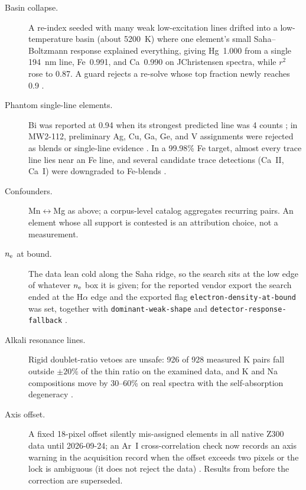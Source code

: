 \begin{description}
\item[Basin collapse.] A re-index seeded with many weak low-excitation lines drifted into a low-temperature basin (about \SI{5200}{\kelvin}) where one element's small Saha--Boltzmann response explained everything, giving Hg~1.000 from a single \SI{194}{\nano\metre} line, Fe~0.991, and Ca~0.990 on JChristensen spectra, while $r^2$ rose to 0.87. A guard rejects a re-solve whose top fraction newly reaches 0.9 %
.
\item[Phantom single-line elements.] Bi was reported at 0.94 when its strongest predicted line was 4 counts %
; in MW2-112, preliminary Ag, Cu, Ga, Ge, and V assignments were rejected as blends or single-line evidence %
. In a 99.98\% Fe target, almost every trace line lies near an Fe line, and several candidate trace detections (Ca~II, Ca~I) were downgraded to Fe-blends %
.
\item[Confounders.] Mn$\leftrightarrow$Mg as above; a corpus-level catalog aggregates recurring pairs. An element whose all support is contested is an attribution choice, not a measurement.
\item[$n_{\mathrm{e}}$ at bound.] The data lean cold along the Saha ridge, so the search sits at the low edge of whatever $n_{\mathrm{e}}$ box it is given; for the reported vendor export the search ended at the H$\alpha$ edge and the exported flag \texttt{electron-density-at-bound} was set, together with \texttt{dominant-weak-shape} and \texttt{detector-response-fallback} %
.
\item[Alkali resonance lines.] Rigid doublet-ratio vetoes are unsafe: 926 of 928 measured K pairs fall outside $\pm20\%$ of the thin ratio on the examined data, and K and Na compositions move by 30--60\% on real spectra with the self-absorption degeneracy %
.
\item[Axis offset.] A fixed 18-pixel offset silently mis-assigned elements in all native Z300 data until 2026-09-24; an Ar~I cross-correlation check now records an axis warning in the acquisition record when the offset exceeds two pixels or the lock is ambiguous (it does not reject the data) %
. Results from before the correction are superseded.
\end{description}

